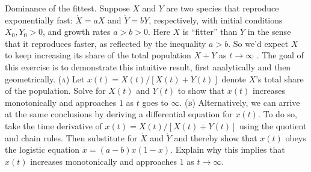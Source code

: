 \documentclass[11pt,answers]{exam}
\begin{document}
\begin{questions}
\item Dominance of the fittest.  Suppose $X$ and $Y$ are two species that reproduce exponentially fast: $\dot{X} = aX$ and $\dot{Y} = bY$, respectively, with initial conditions $X_0, Y_0 > 0$, and growth rates $a > b > 0$. Here $X$ is “fitter” than $Y$ in the sense that it reproduces faster, as reflected by the inequality $a > b$. So we’d expect $X$ to keep increasing its share of the total population $X + Y$ as $t \to \infty$ . The goal of this exercise is to demonstrate this intuitive result, first analytically and then geometrically.
\newline\textsc{(a)} Let $x(t) = X(t)/[X(t) + Y(t)]$ denote $X$'s total share of the population.  Solve for $X(t)$ and $Y(t)$ to show that $x(t)$ increases monotonically and approaches $1$ as $t$ goes to $\infty$.
\newline\textsc{(b)} Alternatively, we can arrive at the same conclusions by deriving a differential equation for $x(t)$. To do so, take the time derivative of $x(t) = X(t)/[X(t) + Y(t)]$ using the quotient and chain rules. Then substitute for $\dot{X}$ and $\dot{Y}$ and thereby show that $x(t)$ obeys the logistic equation $\dot{x} = (a-b)x(1-x)$.  Explain why this implies that $x(t)$ increases monotonically and approaches $1$ as $t \to \infty$.


\end{questions}
\end{document}

